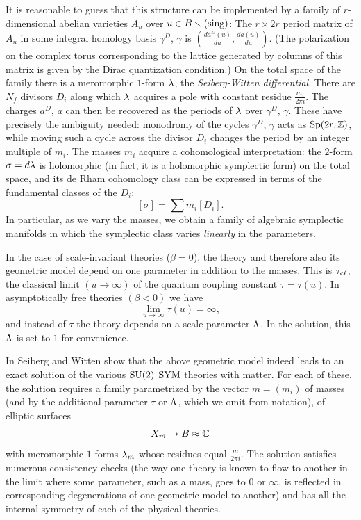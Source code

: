 It is reasonable to guess that this structure can be
implemented by a family of $r$-dimensional abelian varieties
$A_u$ over $u\in B\smallsetminus(\text{\rm sing})$:
The $r\times 2r$ period matrix of $A_u$ in some integral
homology basis $\gamma^D$, $\gamma$ is 
$\left(\frac{da^D(u)}{du},\frac{da(u)}{du}\right)$.
(The polarization on the complex torus corresponding to the
lattice generated by columns of this matrix is given by
the Dirac quantization condition.)
On the total space of the family there is a meromorphic
$1$-form ${\lambda}$, the {\it Seiberg-Witten differential}.
There are $N_f$ divisors $D_i$ along which ${\lambda}$ acquires a
pole with constant residue $\frac{m_i}{2\pi i}$.
The charges $a^D$, $a$ can then be recovered as the periods
of ${\lambda}$ over $\gamma^D$, $\gamma$.
These have precisely the ambiguity needed: monodromy of the
cycles $\gamma^D$, $\gamma$ acts as $\text{\rm Sp}(2r,{\Bbb Z})$, while
moving such a cycle across the divisor $D_i$ changes the
period by an integer multiple of $m_i$.
The masses $m_i$ acquire a cohomological interpretation:
the $2$-form $\sigma=d{\lambda}$ is holomorphic (in fact, it is a
holomorphic symplectic form) on the total space, and its de
Rham cohomology class can be expressed in terms of the
fundamental classes of the $D_i$:
$$
[\sigma]=\sum m_i[D_i].
$$
In particular, as we vary the masses, we obtain a family of
algebraic symplectic manifolds in which the symplectic class
varies {\it linearly} in the parameters.

In the case of scale-invariant theories ($\beta=0$), the
theory and therefore also its geometric model depend on one
parameter in addition to the masses.
This is $\tau_{\text{c$\ell$}}$, the classical limit $(u\to\infty)$ of
the quantum coupling constant $\tau=\tau(u)$.
In asymptotically free theories $(\beta<0)$ we have
$$
\lim\limits_{u\to\infty}\tau(u)=\infty,
$$
and instead of $\tau$ the theory depends on a scale
parameter ${\Lambda}$.
In the \cite{SW1} solution, this ${\Lambda}$ is set to $1$ for
convenience.

In \cite{SW2} Seiberg and Witten show that the above
geometric model indeed leads to an exact solution of the
various $\text{\rm SU}(2)$ $\text{\rm SYM}$ theories with matter.
For each of these, the solution requires a family
parametrized by the vector $m=(m_i)$ of masses (and by the
additional parameter $\tau$ or ${\Lambda}$, which we omit from
notation), of elliptic surfaces 
$$
X_m\to B\approx{\Bbb C}
$$
with meromorphic $1$-forms ${\lambda}_m$ whose residues equal
$\frac{m}{2\pi i}$.
The solution satisfies numerous consistency checks (the way
one theory is known to flow to another in the limit where
some parameter, such as a mass, goes to $0$ or $\infty$, is
reflected in corresponding degenerations of one geometric
model to another) and has all the internal symmetry of each
of the physical theories.

